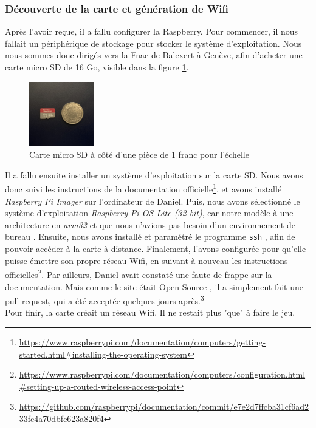 \documentclass[a4paper]{article}
\begin{document}
\subsubsection{Découverte de la carte et génération de Wifi}
Après l'avoir reçue, il a fallu configurer la Raspberry. Pour commencer, il nous fallait un périphérique de stockage pour stocker le système d'exploitation. Nous nous sommes donc dirigés vers la Fnac de Balexert à Genève, afin d'acheter une carte micro SD de 16 Go, visible dans la figure \ref{fig:microsd}.
\begin{figure}
    \centering
    \includegraphics[width=0.25\textwidth]{images/hardware/microSD.jpeg}
    \caption{Carte micro SD à côté d'une pièce de 1 franc pour l'échelle}
    \label{fig:microsd}
\end{figure}
Il a fallu ensuite installer un système d'exploitation sur la carte SD. Nous avons donc suivi les instructions de la documentation officielle\footnote{\url{https://www.raspberrypi.com/documentation/computers/getting-started.html\#installing-the-operating-system}}, et avons installé \textit{Raspberry Pi Imager} sur l'ordinateur de Daniel. Puis, nous avons sélectionné le système d'exploitation \textit{Raspberry Pi OS Lite (32-bit)}, car notre modèle à une architecture en \textit{arm32} \cite{arm32} et que nous n'avions pas besoin d'un environnement de bureau \cite{desktopenv}. Ensuite, nous avons installé et paramétré le programme \texttt{ssh} \cite{ssh}, afin de pouvoir accéder à la carte à distance. Finalement, l'avons configurée pour qu'elle puisse émettre son propre réseau Wifi, en suivant à nouveau les instructions officielles\footnote{\url{https://www.raspberrypi.com/documentation/computers/configuration.html\#setting-up-a-routed-wireless-access-point}}. Par ailleurs, Daniel avait constaté une faute de frappe sur la documentation. Mais comme le site était Open Source \cite{opensource}, il a simplement fait une pull request, qui a été acceptée quelques jours après.\footnote{\url{https://github.com/raspberrypi/documentation/commit/e7e2d7ffcba31cf6ad233fc4a70dbfe623a820f4}} \\
Pour finir, la carte créait un réseau Wifi. Il ne restait plus "que" à faire le jeu. 
\end{document}
